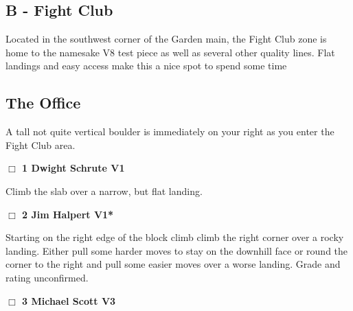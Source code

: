 	\begin{multicols}{2}

\section{B - Fight Club}\label{sa:Fight Club}

Located in the southwest corner of the Garden main, the Fight Club zone is home to the namesake V8 test piece as well as several other quality lines. Flat landings and easy access make this a nice spot to spend some time\\




\needspace{10em}
\subsection*{The Office}\label{bf:The Office}

A tall not quite vertical boulder is immediately on your right as you enter the Fight Club area.\\



\needspace{2em}
\label{rt:Dwight Schrute}
\colorbox{green!20}{
\parbox{0.95\linewidth}{
\hspace{-1ex}\textbf{$\Box$
1 Dwight Schrute V1  \warn
}}}
\begin{adjustwidth}{1.3em}{}			

Climb the slab over a narrow, but flat landing.
\end{adjustwidth}




\needspace{2em}
\label{rt:Jim Halpert}
\colorbox{green!20}{
\parbox{0.95\linewidth}{
\hspace{-1ex}\textbf{$\Box$
2 Jim Halpert V1*  \warn\warn
}}}
\begin{adjustwidth}{1.3em}{}			

Starting on the right edge of the block climb climb the right corner over a rocky landing. Either pull some harder moves to stay on the downhill face or round the corner to the right and pull some easier moves over a worse landing. Grade and rating unconfirmed.
\end{adjustwidth}




\needspace{2em}
\label{rt:Michael Scott}
\colorbox{green!20}{
\parbox{0.95\linewidth}{
\hspace{-1ex}\textbf{$\Box$
3 Michael Scott V3  \warn
}}}
\begin{adjustwidth}{1.3em}{}			


\end{adjustwidth}
\end{multicols}
